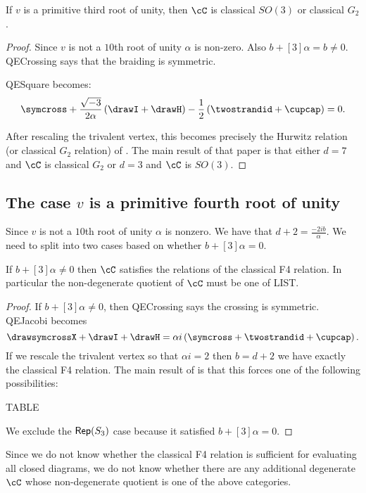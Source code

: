 \documentclass[12pt]{amsart}
\begin{document}
\begin{proposition}
If $v$ is a primitive third root of unity, then $\cC$ is classical $SO(3)$ or classical $G_2$.
\end{proposition}
\begin{proof}
Since $v$ is not a $10$th root of unity $\alpha$ is non-zero.  Also $b+[3]\alpha = b \neq 0$.  QECrossing says that the braiding is symmetric.  

QESquare becomes:
$$\symcross+\frac{\sqrt{-3}}{2\alpha} \left(\drawI + \drawH \right) -\frac{1}{2} \left(\twostrandid + \cupcap \right) = 0.$$

After rescaling the trivalent vertex, this becomes precisely the Hurwitz relation (or classical $G_2$ relation) of \cite{???}.  The main result of that paper is that either $d = 7$ and $\cC$ is classical $G_2$ or $d=3$ and $\cC$ is $SO(3)$.
\end{proof}

\subsection{The case $v$ is a primitive fourth root of unity}

Since $v$ is not a $10$th root of unity $\alpha$ is nonzero.  We have that $d+2 = \frac{-2ib}{\alpha}$.
We need to split into two cases based on whether $b+[3]\alpha = 0$.  

\begin{proposition}
If $b+[3]\alpha \neq 0$ then $\cC$ satisfies the relations of the classical F4 relation.  In particular the non-degenerate quotient of $\cC$ must be one of LIST.
\end{proposition}
\begin{proof}
If $b+[3]\alpha \neq 0$, then QECrossing says the crossing is symmetric.   QEJacobi becomes
$$\drawsymcrossX + \drawI + \drawH = \alpha i \left(\symcross + \twostrandid + \cupcap \right).$$  If we rescale the trivalent vertex so that $\alpha i = 2$ then $b = d+2$ we have exactly the classical F4 relation.  The main result of \cite{???} is that this forces one of the following possibilities:

TABLE

We exclude the $\operatorname{\mathsf{Rep}}(S_3)$ case because it satisfied $b+[3]\alpha = 0$.
\end{proof}

Since we do not know whether the classical F4 relation is sufficient for evaluating all closed diagrams, we do not know whether there are any additional degenerate $\cC$ whose non-degenerate quotient is one of the above categories.
\end{document}
